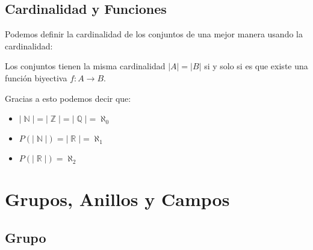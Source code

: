 \documentclass[12pt, fleqn]{report}                             %
\DeclareMathOperator \Naturals  {\mathbb{N}}                     %
\DeclareMathOperator \Integers  {\mathbb{Z}}                     %
\DeclareMathOperator \Racionals {\mathbb{Q}}                     %
\DeclareMathOperator \Reals     {\mathbb{R}}                     %
\begin{document}
        \section{Cardinalidad y Funciones}

            Podemos definir la cardinalidad de los conjuntos de una mejor manera
            usando la cardinalidad:

            Los conjuntos tienen la misma cardinalidad $|A| = |B|$ si y solo si es que existe
            una función biyectiva $f : A \to B$.


            Gracias a esto podemos decir que:

            \begin{itemize} 
                \item $|\Naturals| = |\Integers| = |\Racionals| = \aleph_0$

                \item $P(|\Naturals|) = |\Reals| = \aleph_1$

                \item $P(|\Reals|) = \aleph_2$

            \end{itemize} 














    \chapter{Grupos, Anillos y Campos}
        \clearpage


        \clearpage
        \section{Grupo}

\end{document}
